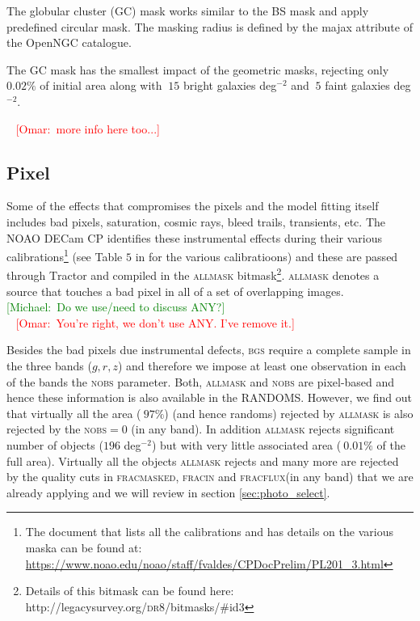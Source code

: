 \documentclass[fleqn,usenatbib]{mnras}
\newcommand{\mike}[1]{~\newline\noindent \textcolor{Green}{{ [Michael:~{#1}]\\}}}
\newcommand{\omar}[1]{~\newline\noindent \textcolor{red}{{ [Omar:~{#1}]\\}}}
\newcommand{\ALLMASK}{\textsc{allmask}\xspace}
\newcommand{\BGS}{\textsc{bgs}\xspace}
\newcommand{\DReight}{\textsc{dr8}\xspace}
\newcommand{\FRACMASKED}{{\textsc{fracmasked}}\xspace}
\newcommand{\FRACFLUX}{{\textsc{fracflux}}\xspace}
\newcommand{\FRACIN}{{\textsc{fracin}}\xspace}
\newcommand{\NOBS}{\textsc{nobs}\xspace}
\newcommand{\TRACTOR}{\textsc{T}ractor\xspace}
\begin{document}
The globular cluster (GC) mask works similar to the BS mask and apply predefined circular mask. The masking radius is defined by the majax attribute of the OpenNGC catalogue.

The GC mask has the smallest impact of the geometric masks, rejecting only $0.02 \%$ of initial area along with  $~15$ bright galaxies deg$^{-2}$ and $~5$ faint galaxies deg$^{-2}$.

\omar{more info here too...}

\subsection{Pixel}\label{subsec:pix_masking}
Some of the effects that compromises the pixels and the model fitting itself includes bad pixels, saturation, cosmic rays, bleed trails, transients, etc. The NOAO DECam CP identifies these instrumental effects during their various calibrations\footnote{The document that lists all the calibrations and has details on the various maska can be found at: \url{https://www.noao.edu/noao/staff/fvaldes/CPDocPrelim/PL201\_3.html}} (see Table $5$ in \cite{2019AJ....157..168D} for the various calibratioons) and these are passed through \TRACTOR and compiled in the \ALLMASK bitmask\footnote{Details of this bitmask can be found here: http://legacysurvey.org/\DReight/bitmasks/\#id3}. \ALLMASK denotes a source that touches a bad pixel in all of a set of overlapping images.
\mike{Do we use/need to discuss ANY?}
\omar{You're right, we don't use ANY. I've remove it.}

Besides the bad pixels due instrumental defects, \BGS require a complete sample in the three bands ($g, r, z$) and therefore we impose at least one observation in each of the bands the \NOBS parameter. Both, \ALLMASK and \NOBS are pixel-based and hence these information is also available in the RANDOMS. However, we find out that virtually all the area ($~97\%$) (and hence randoms) rejected by \ALLMASK is also rejected by the \NOBS$=0$ (in any band). In addition \ALLMASK rejects significant number of objects ($196$ deg$^{-2}$) but with very little associated area ($~0.01\%$ of the full area). Virtually all the objects \ALLMASK rejects and many more are rejected by the quality cuts in \FRACMASKED, \FRACIN and \FRACFLUX (in any band) that we are already applying and we will review in section \ref{sec:photo_select}. 
\end{document}
